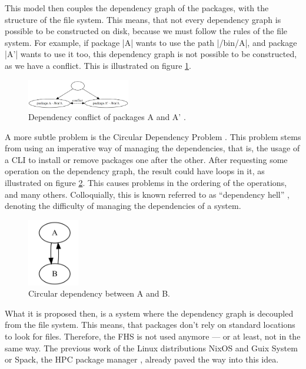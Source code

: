 This model then couples the dependency graph of the packages, with the structure
of the file system. This means, that not every dependency graph is possible to
be constructed on disk, because we must follow the rules of the file system. For
example, if package |A| wants to use the path |/bin/A|, and package |A'| wants
to use it too, this dependency graph is not possible to be constructed, as we
have a conflict. This is illustrated on figure \ref{fig:graph2}.

\begin{figure}
    \centering
    \includegraphics[width=0.4\textwidth]{Screenshot 2023-05-29 153351.png}
    \caption{Dependency conflict of packages A and A' .}
    \label{fig:graph2}
\end{figure}

A more subtle problem is the Circular Dependency Problem \cite{al-mutawaShapeCircularDependencies2014}. This problem stems
from using an imperative way of managing the dependencies, that is, the usage of
a \ac{CLI} to install or remove packages one after the
other. After requesting some operation on the dependency graph, the result could have
loops in it, as illustrated on figure \ref{fig:graph3}. This causes problems in
the ordering of the operations, and many others. Colloquially, this is known referred to as
``dependency hell'' \cite{abateDependencySolvingStill2020}, denoting the difficulty of managing the dependencies of a system.

\begin{figure}
    \centering
    \includegraphics[width=0.2\textwidth]{Screenshot 2023-05-29 154056.png}
    \caption{Circular dependency between A and B.}
    \label{fig:graph3}
\end{figure}

What it is proposed then, is a system where the dependency graph is decoupled
from the file system. This means, that packages don't rely on standard locations
to look for files. Therefore, the \ac{FHS} is not used anymore --- or at least, not
in the same way. The previous work of the Linux distributions
NixOS \cite{dolstraPurelyFunctionalSoftware2006} and Guix System
\cite{courtesFunctionalPackageManagement2013} or Spack, the \ac{HPC} package
manager \cite{gamblinSpackPackageManager2015}, already paved the way into this idea.

